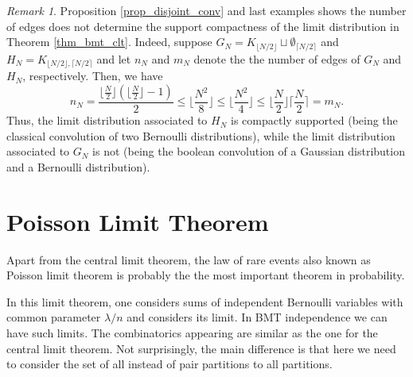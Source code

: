 \documentclass[a4paper,12pt]{extarticle}
\theoremstyle{definition}
\theoremstyle{remark}
\newtheorem{rem}[thm]{Remark}
\begin{document}
\begin{rem}
	Proposition \ref{prop_disjoint_conv} and last examples shows the number of edges does not determine the support compactness of the limit distribution in Theorem \ref{thm_bmt_clt}. 
	Indeed, suppose $G_N=K_{\lfloor N/2 \rfloor} \sqcup \emptyset_{\lceil N/2 \rceil}$ and $H_N=K_{\lfloor N/2 \rfloor,\lceil N/2 \rceil}$ and let $n_N$ and $m_N$ denote the the number of edges of $G_N$ and  $H_N$, respectively. 
	Then, we have 
	$$n_N=\frac{\lfloor \frac{N}{2} \rfloor (\lfloor \frac{N}{2} \rfloor-1) }{2}\leq \lfloor \frac{N^2}{8} \rfloor\leq \lfloor \frac{N^2}{4} \rfloor\leq \lfloor \frac{N}{2} \rfloor\lceil \frac{N}{2} \rceil=m_N.$$
	Thus, the limit distribution associated to $H_N$ is compactly supported (being the classical convolution of two Bernoulli distributions), while the limit distribution associated to $G_N$ is not (being the boolean convolution of a Gaussian distribution and a Bernoulli distribution).
\end{rem}




\section{Poisson Limit Theorem}


Apart from the central limit theorem,  the law of rare events also known as Poisson limit theorem is probably the the most important theorem in probability. 

In this limit theorem,  one considers sums of independent Bernoulli variables with common parameter $\lambda/n$ and considers its limit.  In BMT independence we can have such limits.  The combinatorics appearing are similar as the one for the central limit theorem. Not surprisingly, the main difference is that here we need to consider the set of all instead of  pair partitions to all partitions. 
\end{document}
